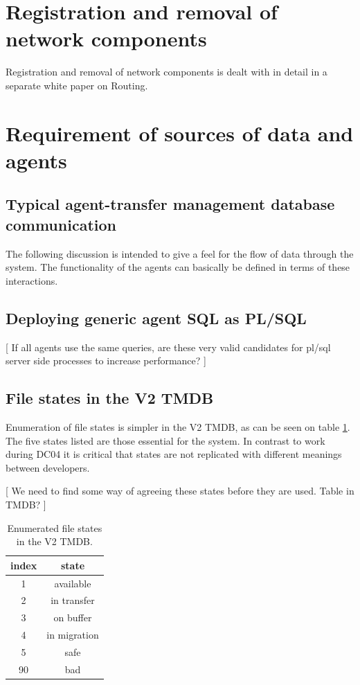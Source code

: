 \documentclass{cmspaper}
\begin{document}
\section{Registration and removal of network components}
Registration and removal of network components is dealt with in detail in a separate white paper on Routing.


\section{Requirement of sources of data and agents}
\subsection{Typical agent-transfer management database communication}
The following discussion is intended to give a feel for the flow
of data through the system. The functionality of the agents can basically be defined in terms of these interactions.

\subsection{Deploying generic agent SQL as PL/SQL}
[ If all agents use the same queries, are these very valid candidates for pl/sql server side processes to increase performance? ]

\subsection{File states in the V2 TMDB}
Enumeration of file states is simpler in the V2 TMDB, as can be seen on table \ref{table:states}. The five states listed are those essential for the system. In contrast to work during DC04 it is critical that states are not replicated with different meanings between developers. 

[ We need to find some way of agreeing these states before they are used. Table in TMDB? ]

\begin{table}
\centering
\begin{tabular}[!h]{|c|c|} 
\hline index & state
\\ \hline
	1	& 	available
\\ 	2	&	in transfer
\\	3	&	on buffer
\\	4	&	in migration
\\	5	&	safe
\\	90	&	bad
\\ \hline
\end{tabular}
\caption{Enumerated file states in the V2 TMDB.}
\label{table:states}
\end{table}
\end{document}
